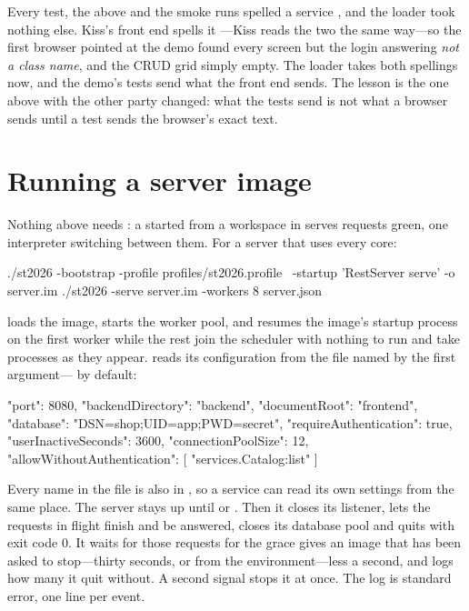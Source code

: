 \begin{stnote}
Every test, the  above and the smoke runs spelled a service
, and the loader took nothing else. Kiss's front end
spells it ---Kiss reads the two the same way---so the
first browser pointed at the demo found every screen but the login
answering \emph{not a class name}, and the CRUD grid simply empty. The
loader takes both spellings now, and the demo's tests send what the front
end sends. The lesson is the one above with the other party changed: what
the tests send is not what a browser sends until a test sends the
browser's exact text.
\end{stnote}

\section{Running a server image}

Nothing above needs : a  started from a workspace
in  serves requests green, one interpreter switching between them.
For a server that uses every core:

\begin{plain}
./st2026 -bootstrap -profile profiles/st2026.profile \
        -startup 'RestServer serve' -o server.im
./st2026 -serve server.im -workers 8 server.json
\end{plain}

 loads the image, starts the worker pool, and resumes the image's
startup process on the first worker while the rest join the scheduler with
nothing to run and take processes as they appear. 
reads its configuration from the file named by the first argument---
\ct{server.json} by default:

\begin{plain}
{ "port": 8080, "backendDirectory": "backend", "documentRoot": "frontend",
  "database": "DSN=shop;UID=app;PWD=secret", "requireAuthentication": true,
  "userInactiveSeconds": 3600, "connectionPoolSize": 12,
  "allowWithoutAuthentication": [ "services.Catalog:list" ] }
\end{plain}

Every name in the file is also in , so a service can
read its own settings from the same place. The server stays up until
\ct{SIGINT} or \ct{SIGTERM}. Then it closes its listener, lets the requests
in flight finish and be answered, closes its database pool and quits with
exit code 0. It waits for those requests for the grace \ct{-serve} gives an
image that has been asked to stop---thirty seconds, or
 from the environment---less a second, and logs
how many it quit without. A second signal stops it at once. The log is
standard error, one line per event.

